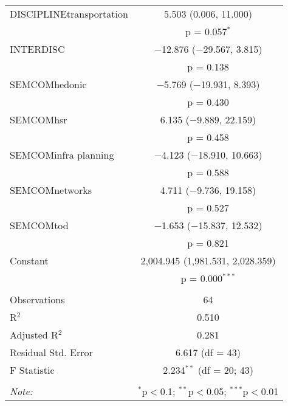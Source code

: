 \begin{table}[!htbp]
\begin{tabular}{@{\extracolsep{5pt}}lc}
  DISCIPLINEtransportation & 5.503 (0.006, 11.000) \\ 
  & p = 0.057$^{*}$ \\ 
  INTERDISC & $-$12.876 ($-$29.567, 3.815) \\ 
  & p = 0.138 \\ 
  SEMCOMhedonic & $-$5.769 ($-$19.931, 8.393) \\ 
  & p = 0.430 \\ 
  SEMCOMhsr & 6.135 ($-$9.889, 22.159) \\ 
  & p = 0.458 \\ 
  SEMCOMinfra planning & $-$4.123 ($-$18.910, 10.663) \\ 
  & p = 0.588 \\ 
  SEMCOMnetworks & 4.711 ($-$9.736, 19.158) \\ 
  & p = 0.527 \\ 
  SEMCOMtod & $-$1.653 ($-$15.837, 12.532) \\ 
  & p = 0.821 \\ 
  Constant & 2,004.945 (1,981.531, 2,028.359) \\ 
  & p = 0.000$^{***}$ \\ 
 \hline \\[-1.8ex] 
Observations & 64 \\ 
R$^{2}$ & 0.510 \\ 
Adjusted R$^{2}$ & 0.281 \\ 
Residual Std. Error & 6.617 (df = 43) \\ 
F Statistic & 2.234$^{**}$ (df = 20; 43) \\ 
\hline 
\hline \\[-1.8ex] 
\textit{Note:}  & \multicolumn{1}{r}{$^{*}$p$<$0.1; $^{**}$p$<$0.05; $^{***}$p$<$0.01} \\ 
\end{tabular} 
\end{table} 
